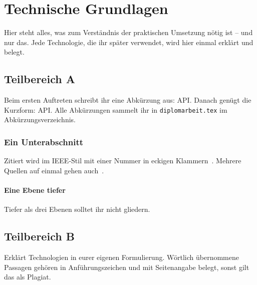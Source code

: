 \chapter{Technische Grundlagen}

Hier steht alles, was zum Verständnis der praktischen Umsetzung nötig ist --
und nur das. Jede Technologie, die ihr später verwendet, wird hier einmal
erklärt und belegt.

\section{Teilbereich A}

Beim ersten Auftreten schreibt ihr eine Abkürzung aus: \ac{API}. Danach
genügt die Kurzform: \ac{API}. Alle Abkürzungen sammelt ihr in
\texttt{diplomarbeit.tex} im Abkürzungsverzeichnis.

\subsection{Ein Unterabschnitt}

Zitiert wird im IEEE-Stil mit einer Nummer in eckigen
Klammern~\cite{beispiel-artikel}. Mehrere Quellen auf einmal gehen
auch~\cite{beispiel-buch,beispiel-online}.

\subsubsection{Eine Ebene tiefer}

Tiefer als drei Ebenen solltet ihr nicht gliedern.

\section{Teilbereich B}

Erklärt Technologien in eurer eigenen Formulierung. Wörtlich übernommene
Passagen gehören in Anführungszeichen und mit Seitenangabe belegt, sonst gilt
das als Plagiat.
